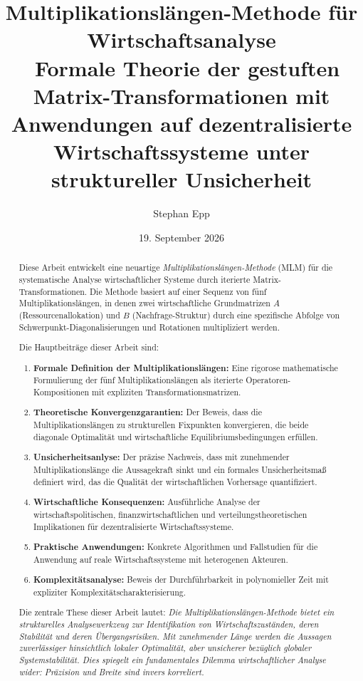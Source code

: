 \documentclass[a4paper,12pt]{article}
\title{\textbf{Multiplikationslängen-Methode für Wirtschaftsanalyse}\\\
Formale Theorie der gestuften Matrix-Transformationen mit Anwendungen auf dezentralisierte Wirtschaftssysteme unter struktureller Unsicherheit}
\author{Stephan Epp}
\date{19. September 2026}
\theoremstyle{definition}
\begin{document}
\maketitle

\begin{abstract}
Diese Arbeit entwickelt eine neuartige \emph{Multiplikationslängen-Methode} (MLM) für die systematische Analyse wirtschaftlicher Systeme durch iterierte Matrix-Transformationen. Die Methode basiert auf einer Sequenz von fünf Multiplikationslängen, in denen zwei wirtschaftliche Grundmatrizen $A$ (Ressourcenallokation) und $B$ (Nachfrage-Struktur) durch eine spezifische Abfolge von Schwerpunkt-Diagonalisierungen und Rotationen multipliziert werden.

Die Hauptbeiträge dieser Arbeit sind:

\begin{enumerate}
\item \textbf{Formale Definition der Multiplikationslängen:} Eine rigorose mathematische Formulierung der fünf Multiplikationslängen als iterierte Operatoren-Kompositionen mit expliziten Transformationsmatrizen.

\item \textbf{Theoretische Konvergenzgarantien:} Der Beweis, dass die Multiplikationslängen zu strukturellen Fixpunkten konvergieren, die beide diagonale Optimalität und wirtschaftliche Equilibriumsbedingungen erfüllen.

\item \textbf{Unsicherheitsanlyse:} Der präzise Nachweis, dass mit zunehmender Multiplikationslänge die Aussagekraft sinkt und ein formales Unsicherheitsmaß definiert wird, das die Qualität der wirtschaftlichen Vorhersage quantifiziert.

\item \textbf{Wirtschaftliche Konsequenzen:} Ausführliche Analyse der wirtschaftspolitischen, finanzwirtschaftlichen und verteilungstheoretischen Implikationen für dezentralisierte Wirtschaftssysteme.

\item \textbf{Praktische Anwendungen:} Konkrete Algorithmen und Fallstudien für die Anwendung auf reale Wirtschaftssysteme mit heterogenen Akteuren.

\item \textbf{Komplexitätsanalyse:} Beweis der Durchführbarkeit in polynomieller Zeit mit expliziter Komplexitätscharakterisierung.
\end{enumerate}

Die zentrale These dieser Arbeit lautet: \emph{Die Multiplikationslängen-Methode bietet ein strukturelles Analysewerkzeug zur Identifikation von Wirtschaftszuständen, deren Stabilität und deren Übergangsrisiken. Mit zunehmender Länge werden die Aussagen zuverlässiger hinsichtlich lokaler Optimalität, aber unsicherer bezüglich globaler Systemstabilität. Dies spiegelt ein fundamentales Dilemma wirtschaftlicher Analyse wider: Präzision und Breite sind invers korreliert.}


\end{abstract}
\end{document}
